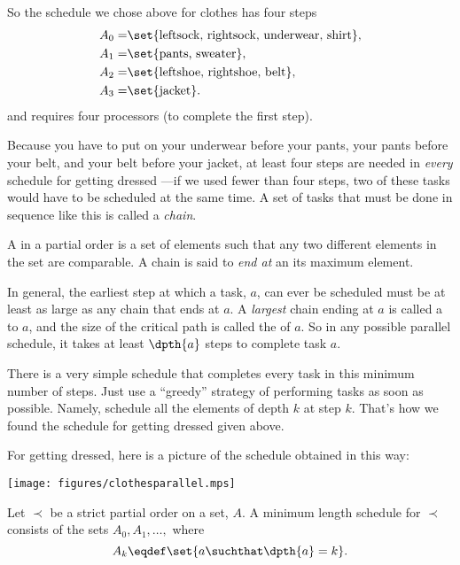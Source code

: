 So the schedule we chose above for clothes has four steps
\begin{align*}
A_0 = & \set{\text{leftsock, rightsock, underwear, shirt}},\\
A_1 = & \set{\text{pants, sweater}},\\
A_2 = & \set{\text{leftshoe, rightshoe, belt}},\\
A_3 = & \set{\text{jacket}}.
\end{align*}
and requires four processors (to complete the first step).

Because you have to put on your underwear before your pants, your
pants before your belt, and your belt before your jacket, at least
four steps are needed in \emph{every} schedule for getting dressed
---if we used fewer than four steps, two of these tasks would have to
be scheduled at the same time.  A set of tasks that must be done in
sequence like this is called a \emph{chain}.

\begin{definition}
A  in a partial order is a set of elements such that any
two different elements in the set are comparable.  A chain is said to
\emph{end at} an its maximum element.
\end{definition}

In general, the earliest step at which a task, $a$, can ever be
scheduled must be at least as large as any chain that ends at $a$.  A
\emph{largest} chain ending at $a$ is called a  to
$a$, and the size of the critical path is called the  of
$a$.  So in any possible parallel schedule, it takes at least
$\dpth{a}$ steps to complete task $a$.

There is a very simple schedule that completes every task in this
minimum number of steps.  Just use a ``greedy'' strategy of performing
tasks as soon as possible.  Namely, schedule all the elements of depth
$k$ at step $k$.  That's how we found the schedule for getting dressed
given above.

\begin{editingnotes}

For getting dressed, here is a picture of the
schedule obtained in this way:

\begin{center}\texttt{[image: figures/clothesparallel.mps]}\end{center}
\end{editingnotes}


\begin{theorem}\label{thm:parallel-time}
Let $\prec$ be a strict partial order on a set, $A$.  A minimum length
schedule for $\prec$ consists of the sets $A_0, A_1,\dots,$
where
\[
A_k \eqdef \set{a \suchthat \dpth{a} =k}.
\]
\end{theorem}

